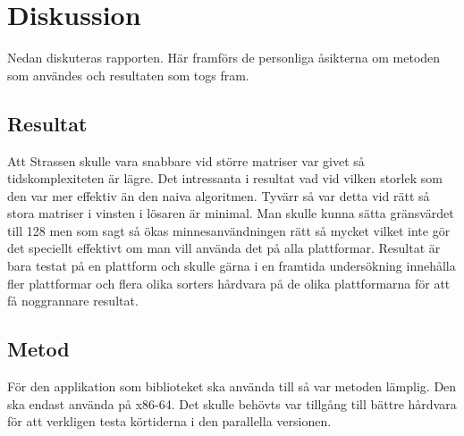 \section{Diskussion}
Nedan diskuteras rapporten. Här framförs de personliga åsikterna om metoden som användes och resultaten som togs fram.
\subsection{Resultat}
Att Strassen skulle vara snabbare vid större matriser var givet så tidskomplexiteten är lägre. Det intressanta i resultat vad vid vilken storlek som den var mer effektiv än den naiva algoritmen. Tyvärr så var detta vid rätt så stora matriser i vinsten i lösaren är minimal. Man skulle kunna sätta gränsvärdet till 128 men som sagt så ökas minnesanvändningen rätt så mycket vilket inte gör det speciellt effektivt om man vill använda det på alla plattformar. Resultat är bara testat på en plattform och skulle gärna i en framtida undersökning innehålla fler plattformar och flera olika sorters hårdvara på de olika plattformarna för att få noggrannare resultat.
\subsection{Metod}
För den applikation som biblioteket ska använda till så var metoden lämplig. Den ska endast använda på x86-64.
Det skulle behövts var tillgång till bättre hårdvara för att verkligen testa körtiderna i den parallella versionen.